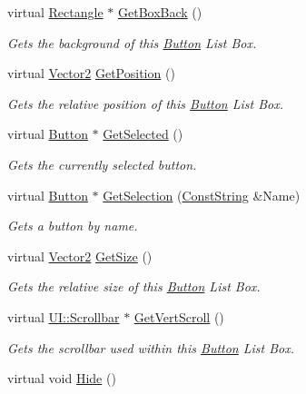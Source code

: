 \begin{DoxyCompactItemize}
virtual \hyperlink{classphys_1_1UI_1_1Rectangle}{Rectangle} $\ast$ \hyperlink{classphys_1_1UI_1_1ButtonListBox_a043ce9d76af4538043551bf508811b12}{GetBoxBack} ()
\begin{DoxyCompactList}\small\item\em Gets the background of this \hyperlink{classphys_1_1UI_1_1Button}{Button} List Box. \item\end{DoxyCompactList}\item 
virtual \hyperlink{classphys_1_1Vector2}{Vector2} \hyperlink{classphys_1_1UI_1_1ButtonListBox_ab7834542f8940adba8df6b1eace92e95}{GetPosition} ()
\begin{DoxyCompactList}\small\item\em Gets the relative position of this \hyperlink{classphys_1_1UI_1_1Button}{Button} List Box. \item\end{DoxyCompactList}\item 
virtual \hyperlink{classphys_1_1UI_1_1Button}{Button} $\ast$ \hyperlink{classphys_1_1UI_1_1ButtonListBox_a2774799b087576f9085c0d713c129e76}{GetSelected} ()
\begin{DoxyCompactList}\small\item\em Gets the currently selected button. \item\end{DoxyCompactList}\item 
virtual \hyperlink{classphys_1_1UI_1_1Button}{Button} $\ast$ \hyperlink{classphys_1_1UI_1_1ButtonListBox_a88796d75b2677b0a8e5d70fcf3677348}{GetSelection} (\hyperlink{namespacephys_a5ce5049f8b4bf88d6413c47b504ebb31}{ConstString} \&Name)
\begin{DoxyCompactList}\small\item\em Gets a button by name. \item\end{DoxyCompactList}\item 
virtual \hyperlink{classphys_1_1Vector2}{Vector2} \hyperlink{classphys_1_1UI_1_1ButtonListBox_a0084510b0b9c53761e5b4a45f65604ab}{GetSize} ()
\begin{DoxyCompactList}\small\item\em Gets the relative size of this \hyperlink{classphys_1_1UI_1_1Button}{Button} List Box. \item\end{DoxyCompactList}\item 
virtual \hyperlink{classphys_1_1UI_1_1Scrollbar}{UI::Scrollbar} $\ast$ \hyperlink{classphys_1_1UI_1_1ButtonListBox_ad0988e4abe0daef3b9949e42c6dfc5fd}{GetVertScroll} ()
\begin{DoxyCompactList}\small\item\em Gets the scrollbar used within this \hyperlink{classphys_1_1UI_1_1Button}{Button} List Box. \item\end{DoxyCompactList}\item 
\hypertarget{classphys_1_1UI_1_1ButtonListBox_a679eaa7b269f5fa20db2c1bff6bc2d3b}{
virtual void \hyperlink{classphys_1_1UI_1_1ButtonListBox_a679eaa7b269f5fa20db2c1bff6bc2d3b}{Hide} ()}
\label{classphys_1_1UI_1_1ButtonListBox_a679eaa7b269f5fa20db2c1bff6bc2d3b}


\end{DoxyCompactItemize}
